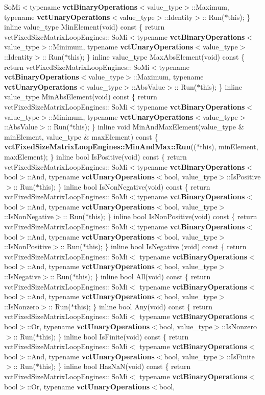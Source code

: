 So\+Mi$<$typename {\bf vct\+Binary\+Operations}$<$value\+\_\+type$>$\+::Maximum, typename {\bf vct\+Unary\+Operations}$<$value\+\_\+type$>$\+::Identity$>$\+:: Run($\ast$this); \} inline value\+\_\+type Min\+Element(void) const \{ return vct\+Fixed\+Size\+Matrix\+Loop\+Engines\+:: So\+Mi$<$typename {\bf vct\+Binary\+Operations}$<$value\+\_\+type$>$\+::Minimum, typename {\bf vct\+Unary\+Operations}$<$value\+\_\+type$>$\+::Identity$>$\+:: Run($\ast$this); \} inline value\+\_\+type Max\+Abs\+Element(void) const \{ return vct\+Fixed\+Size\+Matrix\+Loop\+Engines\+:: So\+Mi$<$typename {\bf vct\+Binary\+Operations}$<$value\+\_\+type$>$\+::Maximum, typename {\bf vct\+Unary\+Operations}$<$value\+\_\+type$>$\+::Abs\+Value$>$\+:: Run($\ast$this); \} inline value\+\_\+type Min\+Abs\+Element(void) const \{ return vct\+Fixed\+Size\+Matrix\+Loop\+Engines\+:: So\+Mi$<$typename {\bf vct\+Binary\+Operations}$<$value\+\_\+type$>$\+::Minimum, typename {\bf vct\+Unary\+Operations}$<$value\+\_\+type$>$\+::Abs\+Value$>$\+:: Run($\ast$this); \} inline void Min\+And\+Max\+Element(value\+\_\+type \& min\+Element, value\+\_\+type \& max\+Element) const \{ {\bf vct\+Fixed\+Size\+Matrix\+Loop\+Engines\+::\+Min\+And\+Max\+::\+Run}(($\ast$this), min\+Element, max\+Element); \} inline bool Is\+Positive(void) const \{ return vct\+Fixed\+Size\+Matrix\+Loop\+Engines\+:: So\+Mi$<$typename {\bf vct\+Binary\+Operations}$<$bool$>$\+::And, typename {\bf vct\+Unary\+Operations}$<$bool, value\+\_\+type$>$\+::Is\+Positive$>$\+:: Run($\ast$this); \} inline bool Is\+Non\+Negative(void) const \{ return vct\+Fixed\+Size\+Matrix\+Loop\+Engines\+:: So\+Mi$<$typename {\bf vct\+Binary\+Operations}$<$bool$>$\+::And, typename {\bf vct\+Unary\+Operations}$<$bool, value\+\_\+type$>$\+::Is\+Non\+Negative$>$\+:: Run($\ast$this); \} inline bool Is\+Non\+Positive(void) const \{ return vct\+Fixed\+Size\+Matrix\+Loop\+Engines\+:: So\+Mi$<$typename {\bf vct\+Binary\+Operations}$<$bool$>$\+::And, typename {\bf vct\+Unary\+Operations}$<$bool, value\+\_\+type$>$\+::Is\+Non\+Positive$>$\+:: Run($\ast$this); \} inline bool Is\+Negative (void) const \{ return vct\+Fixed\+Size\+Matrix\+Loop\+Engines\+:: So\+Mi$<$ typename {\bf vct\+Binary\+Operations}$<$bool$>$\+::And, typename {\bf vct\+Unary\+Operations}$<$bool, value\+\_\+type$>$\+::Is\+Negative$>$\+:: Run($\ast$this); \} inline bool All(void) const \{ return vct\+Fixed\+Size\+Matrix\+Loop\+Engines\+:: So\+Mi$<$ typename {\bf vct\+Binary\+Operations}$<$bool$>$\+::And, typename {\bf vct\+Unary\+Operations}$<$bool, value\+\_\+type$>$\+::Is\+Nonzero$>$\+:: Run($\ast$this); \} inline bool Any(void) const \{ return vct\+Fixed\+Size\+Matrix\+Loop\+Engines\+:: So\+Mi$<$ typename {\bf vct\+Binary\+Operations}$<$bool$>$\+::Or, typename {\bf vct\+Unary\+Operations}$<$bool, value\+\_\+type$>$\+::Is\+Nonzero$>$\+:: Run($\ast$this); \} inline bool Is\+Finite(void) const \{ return vct\+Fixed\+Size\+Matrix\+Loop\+Engines\+:: So\+Mi$<$ typename {\bf vct\+Binary\+Operations}$<$bool$>$\+::And, typename {\bf vct\+Unary\+Operations}$<$bool, value\+\_\+type$>$\+::Is\+Finite$>$\+:: Run($\ast$this); \} inline bool Has\+Na\+N(void) const \{ return vct\+Fixed\+Size\+Matrix\+Loop\+Engines\+:: So\+Mi$<$ typename {\bf vct\+Binary\+Operations}$<$bool$>$\+::Or, typename {\bf vct\+Unary\+Operations}$<$bool, 